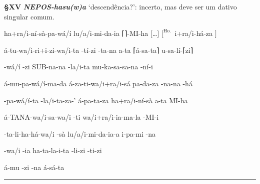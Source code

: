 \smallskip
\noindent\textbf{§XV}\tabto{2em}
\textbf{\emph{\emph{NEPOS}-hasu{(w)}a}} `descendência?': incerto, mas deve ser
um dativo singular comum.




\clearpage
\setcounter{parcount}{18}
\begin{parnumbersr}

	\raggedright%
	\itshape%

	ha+ra/i-ní-sà-pa-wá/í \lmasc{}lu/a/i-mi-da-ia
	\textsc{⌈}\textsc{⌉}-MI-ha
	$[$\ldots$]$ $[^\text{Ho.}$\ \lmasc{}i+ra/i-há-za $]$

	á-tu-wa/i-ri+i-zi-wa/i-ta
	\lmasc{}-tí-zi \lmasc{}-ta-na \lmasc{}a-ta \textsc{⌈}á-sa-ta\textsc{⌉}
	u-sa-lí-\textsc{⌈}zi\textsc{⌉}

	-wá/í -zi \lmasc{}SUB-na-na -la/i-ta
	\lmasc{}mu-ka-sa-sa-na \lmasc{}-ní-i

	á-mu-pa-wá/í-ma-da \lmasc{}á-za-ti-wa/i+ra/i-sá
	\lmasc{}pa-da-za \lmasc{}-na-na
	\lmasc{}-há

	\lmasc{}-pa-wá/í-ta -la/i-ta-za-'
	\lmasc{}á-pa-ta-za \lmasc{}ha+ra/i-ní-sà \lmasc{}a-ta
	\lmasc{}MI-ha

	\lmasc{}á-TANA-wa/i-sa-wa/i \lmasc{}\lmasc{} \lmasc{}-ti
	\lmasc{}wa/i+ra/i-ia-ma-la \lmasc{}-MI-i

	\lmasc{}-ta-li-ha-há-wa/i -sà
	lu/a/i-mi-da-ia-a \lmasc{}\lmasc{} i-pa-mi
	-na

	\lmasc{}-wa/i -ia ha-ta-la-i-ta
	\lmasc{}-li-zi -ti-zi

	\lmasc{}á-mu \lmasc{}\lmasc{} -zi \lmasc{}-na \lmasc{}á-sá-ta


\end{parnumbersr}

\vspace{10pt}
\hrule
\vspace{10pt}

